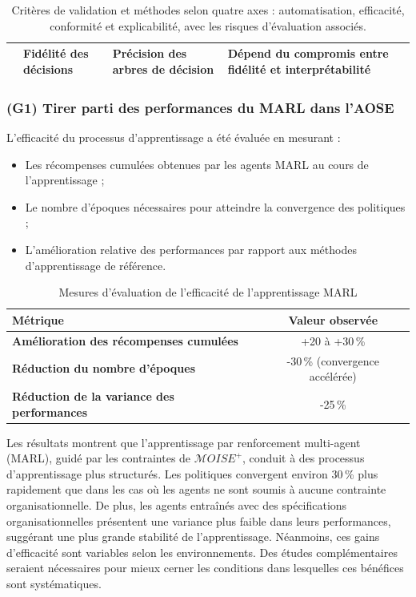 \begin{table}[h!]
\begin{footnotesize}
\begin{tabular}{p{1.5cm}p{2.4cm}p{2.2cm}p{4.5cm}}
                               & Fidélité des décisions   & Précision des arbres de décision & Dépend du compromis entre fidélité et interprétabilité \\
            \hline
        \end{tabular}
        \caption{Critères de validation et méthodes selon quatre axes : automatisation, efficacité, conformité et explicabilité, avec les risques d'évaluation associés.}
        \label{tab:validation_strategy}
    \end{footnotesize}
\end{table}

\subsubsection{(G1) Tirer parti des performances du MARL dans l'AOSE}

L'efficacité du processus d'apprentissage a été évaluée en mesurant :
\begin{itemize}
    \item Les récompenses cumulées obtenues par les agents MARL au cours de l'apprentissage ;
    \item Le nombre d'époques nécessaires pour atteindre la convergence des politiques ;
    \item L'amélioration relative des performances par rapport aux méthodes d'apprentissage de référence.
\end{itemize}

\begin{table}[h!]
    \centering
    \caption{Mesures d'évaluation de l'efficacité de l'apprentissage MARL}
    \begin{tabular}{lc}
        \hline
        \textbf{Métrique}                           & \textbf{Valeur observée}       \\
        \hline
        \textbf{Amélioration des récompenses cumulées} & +20 à +30\,\%                   \\
        \hline
        \textbf{Réduction du nombre d'époques}         & -30\,\% (convergence accélérée) \\
        \hline
        \textbf{Réduction de la variance des performances} & -25\,\%                          \\
        \hline
    \end{tabular}
    \label{tab:efficiency}
\end{table}

Les résultats montrent que l'apprentissage par renforcement multi-agent (MARL), guidé par les contraintes de $\mathcal{M}OISE^+$, conduit à des processus d'apprentissage plus structurés. Les politiques convergent environ 30\,\% plus rapidement que dans les cas où les agents ne sont soumis à aucune contrainte organisationnelle. De plus, les agents entraînés avec des spécifications organisationnelles présentent une variance plus faible dans leurs performances, suggérant une plus grande stabilité de l'apprentissage. Néanmoins, ces gains d'efficacité sont variables selon les environnements. Des études complémentaires seraient nécessaires pour mieux cerner les conditions dans lesquelles ces bénéfices sont systématiques.
